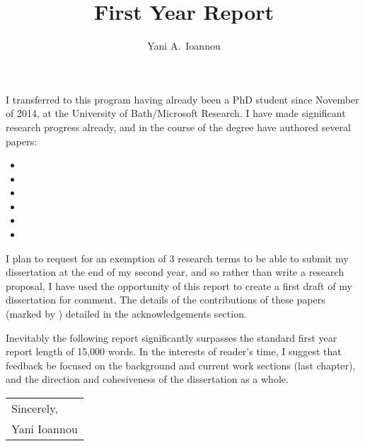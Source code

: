 \documentclass[a4paper,10pt]{article}
\begin{document}

\title{First Year Report}
\author{Yani A.~Ioannou}
\maketitle
\thispagestyle{empty}

I transferred to this program having already been a PhD student since November of 2014, at the University of Bath/Microsoft Research. I have made significant research progress already, and in the course of the degree have authored several papers: 

\begin{itemize}
\footnotesize
    \item {}
	\item \footnotemark[1]
	\item \footnotemark[1]
	\item {}
	\item \footnotemark[1]
	\item {}
\end{itemize}

I plan to request for an exemption of 3 research terms to be able to submit my dissertation at the end of my second year, and so rather than write a research proposal, I have used the opportunity of this report to create a first draft of my dissertation for comment. The details of the contributions of these papers (marked by \footnotemark[1]) detailed in the acknowledgements section.

Inevitably the following report significantly surpasses the standard first year report length of 15,000 words. In the interests of reader's time, I suggest that feedback be focused on the background and current work sections (last chapter), and the direction and cohesiveness of the dissertation as a whole.


\null\hfill
\begin{tabular}{l@{}}
  Sincerely, \\[1\normalbaselineskip]
  Yani Ioannou
\end{tabular}
\end{document}
